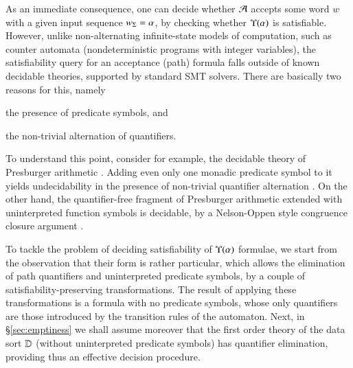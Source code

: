 As an immediate consequence, one can decide whether $\mathcal{A}$ accepts some
word $w$ with a given input sequence ${w}_\Sigma=\alpha$, by checking
whether $\Upsilon({\alpha})$ is satisfiable. However, unlike
non-alternating infinite-state models of computation, such as counter
automata (nondeterministic programs with integer variables), the
satisfiability query for an acceptance (path) formula falls outside of
known decidable theories, supported by standard SMT solvers. There are
basically two reasons for this, namely\ \begin{inparaenum}[(i)]
\item the presence of predicate symbols, and
\item the non-trivial alternation of quantifiers.
\end{inparaenum}
To understand this point, consider for example, the decidable theory
of Presburger arithmetic \cite{Presburger29}. Adding even only one
monadic predicate symbol to it yields undecidability in the presence
of non-trivial quantifier alternation \cite{Halpern91}. On the other
hand, the quantifier-free fragment of Presburger arithmetic extended
with uninterpreted function symbols is decidable, by a Nelson-Oppen
style congruence closure argument \cite{NelsonOppen80}.

To tackle the problem of deciding satisfiability of $\Upsilon({\alpha})$
formulae, we start from the observation that their form is rather
particular, which allows the elimination of path quantifiers and
uninterpreted predicate symbols, by a couple of
satisfiability-preserving transformations. The result of applying
these transformations is a formula with no predicate symbols, whose
only quantifiers are those introduced by the transition rules of the
automaton. Next, in \S\ref{sec:emptiness} we shall assume moreover
that the first order theory of the data sort $\mathbb{D}$ (without
uninterpreted predicate symbols) has quantifier elimination, providing
thus an effective decision procedure.

